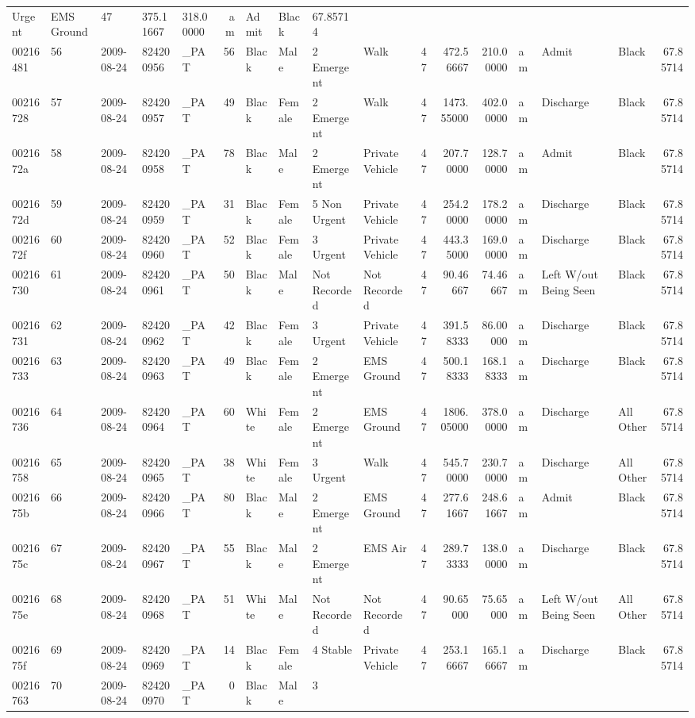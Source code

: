 \documentclass[]{elsarticle} %
\begin{document}
\begin{longtable}[]{@{}lllllrllllrrrlllr@{}}
Urgent & EMS Ground & 47 & 375.11667 & 318.00000 & am & Admit & Black &
67.85714\tabularnewline
00216481 & 56 & 2009-08-24 & 824200956 & \_PAT & 56 & Black & Male & 2
Emergent & Walk & 47 & 472.56667 & 210.00000 & am & Admit & Black &
67.85714\tabularnewline
00216728 & 57 & 2009-08-24 & 824200957 & \_PAT & 49 & Black & Female & 2
Emergent & Walk & 47 & 1473.55000 & 402.00000 & am & Discharge & Black &
67.85714\tabularnewline
0021672a & 58 & 2009-08-24 & 824200958 & \_PAT & 78 & Black & Male & 2
Emergent & Private Vehicle & 47 & 207.70000 & 128.70000 & am & Admit &
Black & 67.85714\tabularnewline
0021672d & 59 & 2009-08-24 & 824200959 & \_PAT & 31 & Black & Female & 5
Non Urgent & Private Vehicle & 47 & 254.20000 & 178.20000 & am &
Discharge & Black & 67.85714\tabularnewline
0021672f & 60 & 2009-08-24 & 824200960 & \_PAT & 52 & Black & Female & 3
Urgent & Private Vehicle & 47 & 443.35000 & 169.00000 & am & Discharge &
Black & 67.85714\tabularnewline
00216730 & 61 & 2009-08-24 & 824200961 & \_PAT & 50 & Black & Male & Not
Recorded & Not Recorded & 47 & 90.46667 & 74.46667 & am & Left W/out
Being Seen & Black & 67.85714\tabularnewline
00216731 & 62 & 2009-08-24 & 824200962 & \_PAT & 42 & Black & Female & 3
Urgent & Private Vehicle & 47 & 391.58333 & 86.00000 & am & Discharge &
Black & 67.85714\tabularnewline
00216733 & 63 & 2009-08-24 & 824200963 & \_PAT & 49 & Black & Female & 2
Emergent & EMS Ground & 47 & 500.18333 & 168.18333 & am & Discharge &
Black & 67.85714\tabularnewline
00216736 & 64 & 2009-08-24 & 824200964 & \_PAT & 60 & White & Female & 2
Emergent & EMS Ground & 47 & 1806.05000 & 378.00000 & am & Discharge &
All Other & 67.85714\tabularnewline
00216758 & 65 & 2009-08-24 & 824200965 & \_PAT & 38 & White & Female & 3
Urgent & Walk & 47 & 545.70000 & 230.70000 & am & Discharge & All Other
& 67.85714\tabularnewline
0021675b & 66 & 2009-08-24 & 824200966 & \_PAT & 80 & Black & Male & 2
Emergent & EMS Ground & 47 & 277.61667 & 248.61667 & am & Admit & Black
& 67.85714\tabularnewline
0021675c & 67 & 2009-08-24 & 824200967 & \_PAT & 55 & Black & Male & 2
Emergent & EMS Air & 47 & 289.73333 & 138.00000 & am & Discharge & Black
& 67.85714\tabularnewline
0021675e & 68 & 2009-08-24 & 824200968 & \_PAT & 51 & White & Male & Not
Recorded & Not Recorded & 47 & 90.65000 & 75.65000 & am & Left W/out
Being Seen & All Other & 67.85714\tabularnewline
0021675f & 69 & 2009-08-24 & 824200969 & \_PAT & 14 & Black & Female & 4
Stable & Private Vehicle & 47 & 253.16667 & 165.16667 & am & Discharge &
Black & 67.85714\tabularnewline
00216763 & 70 & 2009-08-24 & 824200970 & \_PAT & 0 & Black & Male & 3

\end{longtable}
\end{document}
